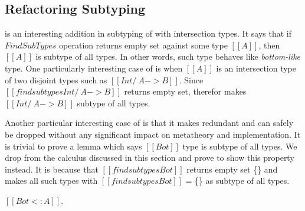 
\subsection{Refactoring Subtyping}
\label{sec:inter:refactoring}
 is an interesting addition in subtyping of \cal with intersection types.
It says that if $FindSubTypes$ operation returns empty set against some type $[[A]]$, then $[[A]]$
is subtype of all types. In other words, such type behaves like \emph{bottom-like} type.
One particularly interesting case of  is when $[[A]]$ is an intersection type of two
disjoint types such as $[[Int /\ A -> B]]$. Since $[[findsubtypes Int /\ A -> B]]$ returns empty set,
therefor  makes $[[Int /\ A -> B]]$ subtype of all types.

Another particular interesting case of  is that it makes  redundant 
and  can safely be dropped without any significant
impact on metatheory and implementation. It is trivial to prove a lemma which says $[[Bot]]$ type is
subtype of all types. We drop  from the calculus discussed in this section
and prove  to show this property instead. It is because that $[[findsubtypes Bot]]$
returns empty set \{\} and  makes all such types with $[[findsubtypes Bot]]$ = \{\} as
subtype of all types.

\begin{lemma}
  $[[Bot <: A]]$.
\label{lemma:inter:bls}
\end{lemma}